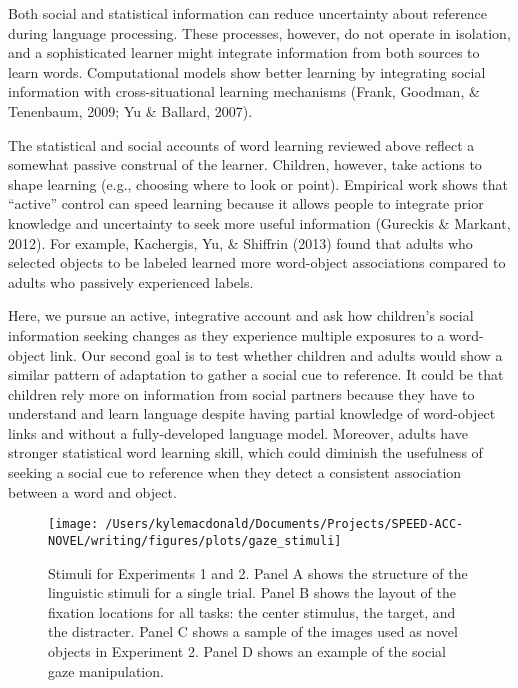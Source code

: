 \documentclass[10pt, letterpaper]{article}
\newenvironment{CodeChunk}{}{}
\begin{document}
Both social and statistical information can reduce uncertainty about
reference during language processing. These processes, however, do not
operate in isolation, and a sophisticated learner might integrate
information from both sources to learn words. Computational models show
better learning by integrating social information with cross-situational
learning mechanisms (Frank, Goodman, \& Tenenbaum, 2009; Yu \& Ballard,
2007).

The statistical and social accounts of word learning reviewed above
reflect a somewhat passive construal of the learner. Children, however,
take actions to shape learning (e.g., choosing where to look or point).
Empirical work shows that ``active'' control can speed learning because
it allows people to integrate prior knowledge and uncertainty to seek
more useful information (Gureckis \& Markant, 2012). For example,
Kachergis, Yu, \& Shiffrin (2013) found that adults who selected objects
to be labeled learned more word-object associations compared to adults
who passively experienced labels.

Here, we pursue an active, integrative account and ask how children's
social information seeking changes as they experience multiple exposures
to a word-object link. Our second goal is to test whether children and
adults would show a similar pattern of adaptation to gather a social cue
to reference. It could be that children rely more on information from
social partners because they have to understand and learn language
despite having partial knowledge of word-object links and without a
fully-developed language model. Moreover, adults have stronger
statistical word learning skill, which could diminish the usefulness of
seeking a social cue to reference when they detect a consistent
association between a word and object.

\begin{CodeChunk}
\begin{figure*}[h]

{\centering \texttt{[image: /Users/kylemacdonald/Documents/Projects/SPEED-ACC-NOVEL/writing/figures/plots/gaze\_stimuli]} 

}

\caption[Stimuli for Experiments 1 and 2]{Stimuli for Experiments 1 and 2. Panel A shows the structure of the linguistic stimuli for a single trial. Panel B shows the layout of the fixation locations for all tasks: the center stimulus, the target, and the distracter. Panel C shows a sample of the images used as novel objects in Experiment 2. Panel D shows an example of the social gaze manipulation.}\label{fig:gaze-stimuli}
\end{figure*}
\end{CodeChunk}
\end{document}

